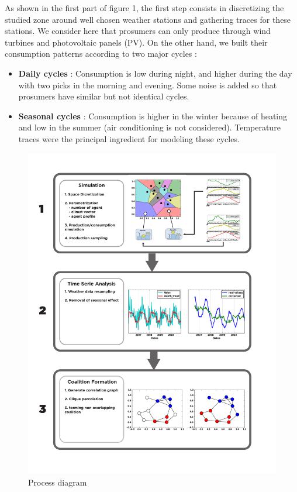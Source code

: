 \documentclass[conference]{IEEEtran}
\begin{document}
As shown in the first part of figure 1, the first step consists in discretizing the studied zone around well chosen weather stations and gathering traces for these stations. We consider here that prosumers can only produce through wind turbines and photovoltaic panels (PV). On the other hand, we built their consumption patterns according to two major cycles :
\begin{itemize}
\item \textbf{Daily cycles} : Consumption is low during night, and higher during the day with two picks in the morning and evening. Some noise is added so that prosumers have similar but not identical cycles.
\item \textbf{Seasonal cycles} : Consumption is higher in the winter because of heating and low in the summer (air conditioning is not considered). Temperature traces were the principal ingredient for modeling these cycles.
\end{itemize} 

\begin{center}
\begin{figure}
\includegraphics[scale=0.43]{figure2/Fig2}
\caption{Process diagram}
\label{Fig1}
\end{figure}
\end{center}
\end{document}
